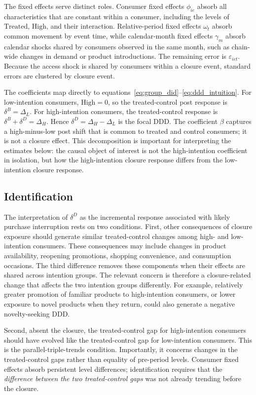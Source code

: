 \documentclass[11 pt]{article}
\begin{document}
The fixed effects serve distinct roles. Consumer fixed effects $\phi_{ie}$ absorb all characteristics that are constant within a consumer, including the levels of $\text{Treated}$, $\text{High}$, and their interaction. Relative-period fixed effects $\omega_t$ absorb common movement by event time, while calendar-month fixed effects $\gamma_m$ absorb calendar shocks shared by consumers observed in the same month, such as chain-wide changes in demand or product introductions. The remaining error is $\varepsilon_{iet}$. Because the access shock is shared by consumers within a closure event, standard errors are clustered by closure event.

The coefficients map directly to equations~\eqref{eq:group_did}--\eqref{eq:ddd_intuition}. For low-intention consumers, $\text{High}=0$, so the treated-control post response is $\delta^B=\Delta_L$. For high-intention consumers, the treated-control response is $\delta^B+\delta^D=\Delta_H$. Hence $\delta^D=\Delta_H-\Delta_L$ is the focal DDD. The coefficient $\beta$ captures a high-minus-low post shift that is common to treated and control consumers; it is not a closure effect. This decomposition is important for interpreting the estimates below: the causal object of interest is not the high-intention coefficient in isolation, but how the high-intention closure response differs from the low-intention closure response.

\subsection{Identification}
\label{section:3.3.1}

The interpretation of $\delta^D$ as the incremental response associated with likely purchase interruption rests on two conditions. First, other consequences of closure exposure should generate similar treated-control changes among high- and low-intention consumers. These consequences may include changes in product availability, reopening promotions, shopping convenience, and consumption occasions. The third difference removes these components when their effects are shared across intention groups. The relevant concern is therefore a closure-related change that affects the two intention groups differently. For example, relatively greater promotion of familiar products to high-intention consumers, or lower exposure to novel products when they return, could also generate a negative novelty-seeking DDD.

Second, absent the closure, the treated-control gap for high-intention consumers should have evolved like the treated-control gap for low-intention consumers. This is the parallel-triple-trends condition. Importantly, it concerns changes in the treated-control gaps rather than equality of pre-period levels. Consumer fixed effects absorb persistent level differences; identification requires that the \textit{difference between the two treated-control gaps} was not already trending before the closure.
\end{document}

